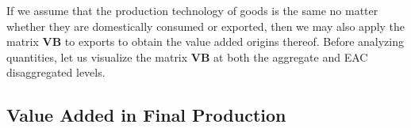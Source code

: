 \documentclass[a4paper]{article}
\begin{document}
If we assume that the production technology of goods is the same no matter whether they are domestically consumed or exported, then we may also apply the matrix \textbf{VB} to exports to obtain the value added origins thereof. Before analyzing quantities, let us visualize the matrix \textbf{VB} at both the aggregate and EAC disaggregated levels. \newline

\subsection{Value Added in Final Production}





%
\end{document}
